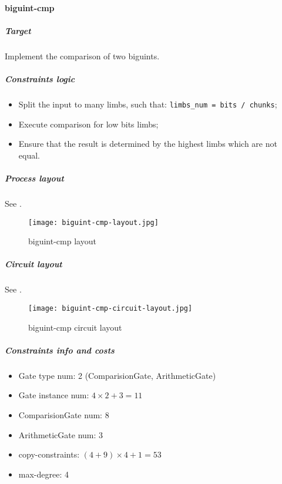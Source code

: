 \paragraph{biguint-cmp}

\subparagraph{Target}
Implement the comparison of two biguints.

\subparagraph{Constraints logic}
\begin{itemize}
    \item Split the input to many limbs, such that: \verb|limbs_num = bits / chunks|;
    \item Execute comparison for low bits limbs;
    \item Ensure that the result is determined by the highest limbs which are not equal.
\end{itemize}

\subparagraph{Process layout}
See .
\begin{figure}[!ht]
    \centering
    \texttt{[image: biguint-cmp-layout.jpg]}
    \caption{biguint-cmp layout}
    \label{fig:biguint-cmp-layout}
\end{figure}

\subparagraph{Circuit layout}
See .
\begin{figure}[!ht]
    \centering
    \texttt{[image: biguint-cmp-circuit-layout.jpg]}
    \caption{biguint-cmp circuit layout}
    \label{fig:biguint-cmp-circuit-layout}
\end{figure}

\subparagraph{Constraints info and costs}
\begin{itemize}
    \item Gate type num: 2 (ComparisionGate, ArithmeticGate)
    \item Gate instance num: $4 \times 2 + 3 = 11$
    \item ComparisionGate num: 8
    \item ArithmeticGate num: 3
    \item copy-constraints: $(4 + 9) \times 4 + 1 = 53$
    \item max-degree: 4
\end{itemize}
